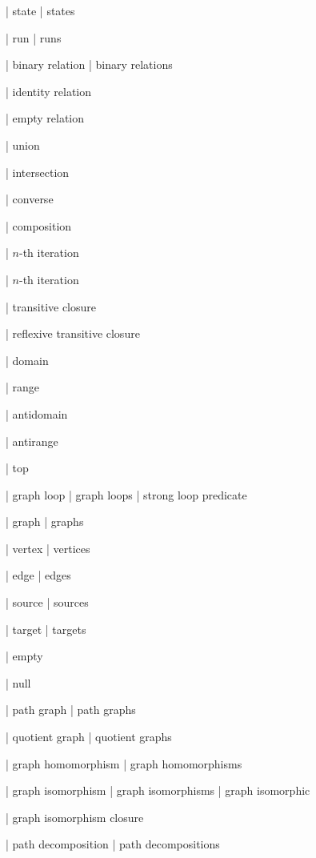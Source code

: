 | state
| states

| run
| runs

%

| binary relation
| binary relations

| identity relation

| empty relation 

| union

| intersection

| converse

| composition

| $n$-th iteration

| $n$-th iteration

| transitive closure

| reflexive transitive closure

| domain

| range

| antidomain

| antirange

| top

| graph loop
| graph loops
| strong loop predicate

%
| graph
| graphs

| vertex
| vertices

| edge
| edges

| source
| sources

| target
| targets

| empty

| null

| path graph
| path graphs

| quotient graph
| quotient graphs

| graph homomorphism
| graph homomorphisms

| graph isomorphism
| graph isomorphisms
| graph isomorphic

| graph isomorphism closure

| path decomposition
| path decompositions

